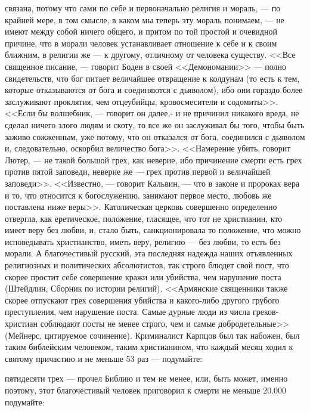 \documentclass[12pt]{article}
\begin{document}
связана, потому что сами по себе и первоначально религия и мораль, --- по крайней мере, в том смысле, в каком мы теперь эту мораль понимаем, --- не имеют между собой ничего общего, и притом по той простой и очевидной причине, что в морали человек устанавливает отношение к себе и к своим ближним, в религии же --- к другому, отличному от человека существу. <<Все священное писание, --- говорит Боден в своей <<Демономании>>  --- полно свидетельств, что бог питает величайшее отвращение к колдунам (то есть к тем, которые отказываются от бога и соединяются с дьяволом), ибо они гораздо более заслуживают проклятия, чем отцеубийцы, кровосмесители и содомиты>>. <<Если бы волшебник, --- говорит он далее,- и не причинил никакого вреда, не сделал ничего злого людям и скоту, то все же он заслуживал бы того, чтобы быть заживо сожженным, уже потому, что он отказался от бога, соединился с дьяволом и, следовательно, оскорбил величество бога>>. <<Намерение убить, говорит Лютер, --- не такой большой грех, как неверие, ибо причинение смерти есть грех против пятой заповеди, неверие же --- грех против первой и величайшей заповеди>>. <<Известно, --- говорит Кальвин, --- что в законе и пророках вера и то, что относится к богослужению, занимают первое место, любовь же поставлена ниже веры>>. Католическая церковь совершенно определенно отвергла, как еретическое, положение, гласящее, что тот не христианин, кто имеет веру без любви, и, стало быть, санкционировала то положение, что можно исповедывать христианство, иметь веру, религию --- без любви, то есть без морали. А благочестивый русский, эта последняя надежда наших отъявленных религиозных и политических абсолютистов, так строго блюдет свой пост, что скорее простит себе совершение кражи или убийства, чем нарушение поста (Штейдлин, Сборник по истории религий). <<Армянские священники также скорее отпускают грех совершения убийства и какого-либо другого грубого преступления, чем нарушение поста. Самые дурные люди из числа греков-христиан соблюдают посты не менее строго, чем и самые добродетельные>> (Мейнерс, цитируемое сочинение). Криминалист Карпцов был так набожен, был таким библейским человеком, таким христианином, что каждый месяц ходил к святому причастию и не меньше 53 раз --- подумайте: 

пятидесяти трех --- прочел Библию и тем не менее, или, быть может, именно поэтому, этот благочестивый человек приговорил к смерти не меньше 20.000 подумайте: 
\end{document}
